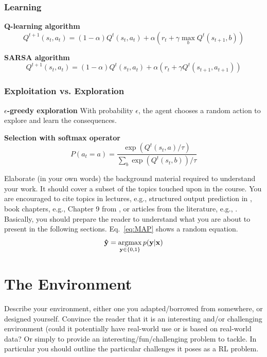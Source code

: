 \documentclass[journal, a4paper]{IEEEtran}
\newcommand{\argmax}{\operatornamewithlimits{argmax}}
\newcommand{\x}{\mathbf{x}}
\newcommand{\y}{\mathbf{y}}
\newcommand{\ypred}{\mathbf{\hat y}}
\begin{document}
\subsubsection{Learning}

\textbf{Q-learning algorithm}
\cite{lecture-rl}
\cite{lecture-rl2}
\cite{intro-rl}
\cite{qlearning}
\[
	Q^{t+1}(s_t, a_t) = (1-\alpha) Q^t(s_t, a_t) + \alpha (r_t + \gamma \max\limits_b Q^t(s_{t+1}, b))
\]

\textbf{SARSA algorithm}
\cite{lecture-rl}
\cite{lecture-rl2}
\cite{intro-rl}
\cite{sarsa}
\[
	Q^{t+1}(s_t, a_t) = (1-\alpha) Q^t(s_t, a_t) + \alpha (r_t + \gamma Q^t(s_{t+1}, a_{t+1}))
\]

\subsubsection{Exploitation vs. Exploration}

\textbf{$\epsilon$-greedy exploration}
\cite{lecture-rl}
\cite{lecture-rl2}
\cite{intro-rl}
With probability $\epsilon$, the agent chooses a random action to explore and learn the consequences.

\textbf{Selection with softmax operator}
\cite{intro-rl}
\[
    P\left(a_t = a\right) = \frac{\exp\left(Q^t(s_t, a) / \tau\right)}{\sum\limits_b \exp\left(Q^t(s_t, b)\right) / \tau}
\]


Elaborate (in your own words) the background material required to understand your work. It should cover a subset of the topics touched upon in the course. You are encouraged to cite topics in lectures, e.g., structured output prediction in , book chapters, e.g., Chapter 9 from , or articles from the literature, e.g., . Basically, you should prepare the reader to understand what you are about to present in the following sections. Eq.~\eqref{eq:MAP} shows a random equation.
\begin{equation}
	\label{eq:MAP}
	\ypred = \argmax_{\y \in \{0,1\}} p(\y|\x)
\end{equation}

\section{The Environment}

Describe your environment, either one you adapted/borrowed from somewhere, or designed yourself. Convince the reader that it is an interesting and/or challenging environment (could it potentially have real-world use or is based on real-world data? Or simply to provide an interesting/fun/challenging problem to tackle. In particular you should outline the particular challenges it poses as a RL problem.
\end{document}
